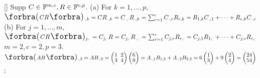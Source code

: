 [\Sbra]{
	Supp $C\in{\mathbb{F}}^{m,c},R\in{\mathbb{F}}^{c,p}$. \hfill{}\TextB{\vspace{2pt}}
	(a) For $k=1,\dots,p,$\quad $\BigPar{CR}{_{\cdot,k}}=CR_{\cdot,k}=C_{\cdot,\cdot}R_{\cdot,k}=\sum_{r=1}^c C_{\cdot,r}R_{r,k}=R_{1,k}C_{\cdot,1}+\dots+R_{c,k}C_{\cdot,c}$\TextB{\vspace{3pt}}
	(b) For $j=1,\dots,m,$\quad $\BigPar{CR}{_{j,\cdot}}=C_{j,\cdot}R=C_{j,\cdot}R_{\cdot,\cdot}=\sum_{r=1}^c C_{j,r}R_{r,\cdot}=C_{j,1}R_{1,\cdot}+\dots+C_{j,c}R_{c,\cdot}$\TextB{\vspace{2pt}}
}\BulletPointX\AExa $m=2,c=2,p=3.$\TextB{\vspace{2pt}}
$\BigPar{AB}{_{\cdot,2}}=AB_{\cdot, 2}=\begin{pmatrix} 1 &\hspace{-4pt} 2\\[-2pt] 3 &\hspace{-4pt} 4\end{pmatrix}\begin{pmatrix} 6 \\[-2pt] 9\end{pmatrix}=A_{\cdot,1}B_{1,2}+A_{\cdot,2}B_{2,2}=6\begin{pmatrix}1\\[-2pt]3\end{pmatrix}+9\begin{pmatrix}2\\[-2pt]4\end{pmatrix}=\begin{pmatrix} 24\\[-2pt] 54\end{pmatrix}$;\TextB{\vspace{2pt}}
